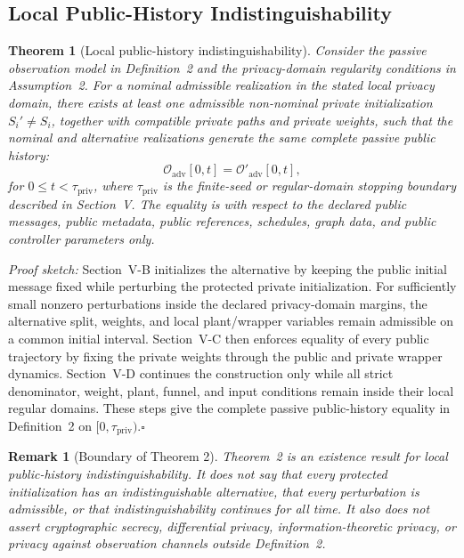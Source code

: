 \documentclass[journal]{IEEEtran}
\newtheorem{theorem}{Theorem}
\newtheorem{remark}{Remark}
\begin{document}
\subsection{Local Public-History Indistinguishability}

\begin{theorem}[Local public-history indistinguishability]
Consider the passive observation model in Definition~2 and the privacy-domain
regularity conditions in Assumption~2. For a nominal admissible realization in
the stated local privacy domain, there exists at least one admissible
non-nominal private initialization $S_i'\neq S_i$, together with compatible
private paths and private weights, such that the nominal and alternative
realizations generate the same complete passive public history:
\begin{equation}
\mathcal O_{\mathrm{adv}}[0,t]
=\mathcal O'_{\mathrm{adv}}[0,t],
\label{eq:theorem_public_history_equality}
\end{equation}
for $0\leq t<\tau_{\mathrm{priv}}$, where $\tau_{\mathrm{priv}}$ is the
finite-seed or regular-domain stopping
boundary described in Section~V. The equality is with respect to the declared
public messages, public metadata, public references, schedules, graph data, and
public controller parameters only.
\end{theorem}

\noindent\textit{Proof sketch:}
Section~V-B initializes the alternative by keeping the public initial message
fixed while perturbing the protected private initialization. For sufficiently
small nonzero perturbations inside the declared privacy-domain margins, the
alternative split, weights, and local plant/wrapper variables remain admissible
on a common initial interval. Section~V-C then enforces equality of every public
trajectory by fixing the private weights through the public and private wrapper
dynamics. Section~V-D continues the construction only while all strict
denominator, weight, plant, funnel, and input conditions remain inside their
local regular domains. These steps give the complete passive public-history
equality in Definition~2 on $[0,\tau_{\mathrm{priv}})$.\hfill$\square$

\begin{remark}[Boundary of Theorem 2]
Theorem~2 is an existence result for local public-history indistinguishability.
It does not say that every protected initialization has an indistinguishable
alternative, that every perturbation is admissible, or that indistinguishability
continues for all time. It also does not assert cryptographic secrecy,
differential privacy, information-theoretic privacy, or privacy against
observation channels outside Definition~2.
\end{remark}
\end{document}
